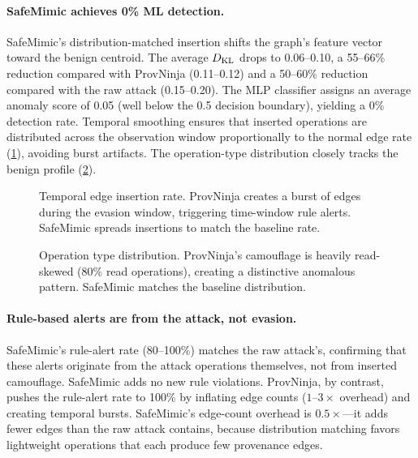 \paragraph{SafeMimic achieves 0\% ML detection.}
SafeMimic's distribution-matched insertion shifts the graph's feature vector toward the benign centroid.
The average $D_{\text{KL}}$ drops to 0.06--0.10, a 55--66\% reduction compared with ProvNinja (0.11--0.12) and a 50--60\% reduction compared with the raw attack (0.15--0.20).
The MLP classifier assigns an average anomaly score of 0.05 (well below the 0.5 decision boundary), yielding a 0\% detection rate.
Temporal smoothing ensures that inserted operations are distributed across the observation window proportionally to the normal edge rate (\cref{fig:temporal}), avoiding burst artifacts.
The operation-type distribution closely tracks the benign profile (\cref{fig:opdist}).

\begin{figure}[t]
    \centering
    \caption{Temporal edge insertion rate. ProvNinja creates a burst of edges during the evasion window, triggering time-window rule alerts. SafeMimic spreads insertions to match the baseline rate.}
    \label{fig:temporal}
\end{figure}

\begin{figure}[t]
    \centering
    \caption{Operation type distribution. ProvNinja's camouflage is heavily read-skewed (80\% read operations), creating a distinctive anomalous pattern. SafeMimic matches the baseline distribution.}
    \label{fig:opdist}
\end{figure}

\paragraph{Rule-based alerts are from the attack, not evasion.}
SafeMimic's rule-alert rate (80--100\%) matches the raw attack's, confirming that these alerts originate from the attack operations themselves, not from inserted camouflage.
SafeMimic adds no new rule violations.
ProvNinja, by contrast, pushes the rule-alert rate to 100\% by inflating edge counts ($1$--$3\times$ overhead) and creating temporal bursts.
SafeMimic's edge-count overhead is $0.5\times$---it adds fewer edges than the raw attack contains, because distribution matching favors lightweight operations that each produce few provenance edges.

